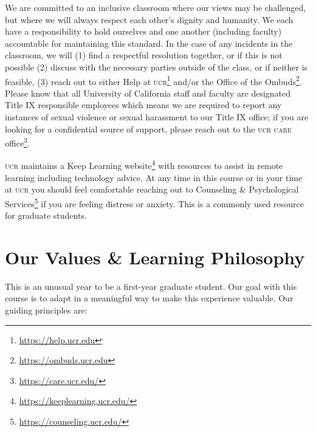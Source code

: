 \documentclass[12pt]{article}
\numberwithin{equation}{section}    %
\begin{document}
We are committed to an inclusive classroom where our views may be challenged, but where we will always respect each other's dignity and humanity. We each have a responsibility to hold ourselves and one another (including faculty) accountable for maintaining this standard. In the case of any incidents in the classroom, we will (1) find a respectful resolution together, or if this is not possible (2) discuss with the necessary parties outside of the class, or if neither is feasible, (3) reach out to either {Help at \textsc{ucr}}\footnote{\url{https://help.ucr.edu}} and/or the {Office of the Ombuds}\footnote{\url{https://ombuds.ucr.edu}}. Please know that all University of California staff and faculty are designated Title IX responsible employees which means we are required to report any instances of sexual violence or sexual harassment to our Title IX office; if you are looking for a confidential source of support, please reach out to the \textsc{ucr care} office\footnote{\url{https://care.ucr.edu/}}.

\textsc{ucr} maintains a Keep Learning website\footnote{\url{https://keeplearning.ucr.edu/}} with resources to assist in remote learning including technology advice. At any time in this course or in your time at \textsc{ucr} you should feel comfortable reaching out to Counseling \& Psychological Services\footnote{\url{https://counseling.ucr.edu/}} if you are feeling distress or anxiety. This is a commonly used resource for graduate students.

\section*{Our Values \& Learning Philosophy}

This is an unusual year to be a first-year graduate student. Our goal with this course is to adapt in a meaningful way to make this experience valuable. Our guiding principles are:
\end{document}

